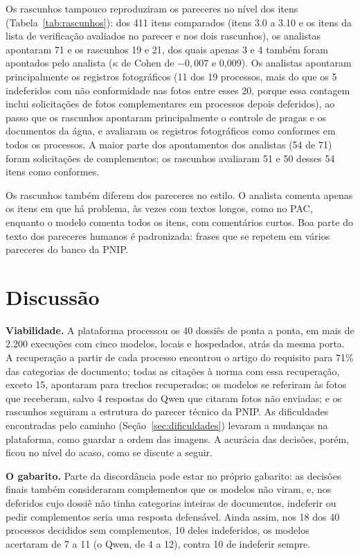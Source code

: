 Os rascunhos tampouco reproduziram os pareceres no nível dos itens (Tabela~\ref{tab:rascunhos}): dos 411 itens comparados (itens 3.0 a 3.10 e os itens da lista de verificação avaliados no parecer e nos dois rascunhos), os analistas apontaram 71 e os rascunhos 19 e 21, dos quais apenas 3 e 4 também foram apontados pelo analista ($\kappa$ de Cohen de $-0{,}007$ e 0,009). Os analistas apontaram principalmente os registros fotográficos (11 dos 19 processos, mais do que os 5 indeferidos com não conformidade nas fotos entre esses 20, porque essa contagem inclui solicitações de fotos complementares em processos depois deferidos), ao passo que os rascunhos apontaram principalmente o controle de pragas e os documentos da água, e avaliaram os registros fotográficos como conformes em todos os processos. A maior parte dos apontamentos dos analistas (54 de 71) foram solicitações de complementos; os rascunhos avaliaram 51 e 50 desses 54 itens como conformes.

Os rascunhos também diferem dos pareceres no estilo. O analista comenta apenas os itens em que há problema, às vezes com textos longos, como no PAC, enquanto o modelo comenta todos os itens, com comentários curtos. Boa parte do texto dos pareceres humanos é padronizada: frases que se repetem em vários pareceres do banco da PNIP.

\section{Discussão}
\label{sec:discussao}

\textbf{Viabilidade.} A plataforma processou os 40 dossiês de ponta a ponta, em mais de 2.200 execuções com cinco modelos, locais e hospedados, atrás da mesma porta. A recuperação a partir de cada processo encontrou o artigo do requisito para 71\% das categorias de documento; todas as citações à norma com essa recuperação, exceto 15, apontaram para trechos recuperados; os modelos se referiram às fotos que receberam, salvo 4 respostas do Qwen que citaram fotos não enviadas; e os rascunhos seguiram a estrutura do parecer técnico da PNIP. As dificuldades encontradas pelo caminho (Seção~\ref{sec:dificuldades}) levaram a mudanças na plataforma, como guardar a ordem das imagens. A acurácia das decisões, porém, ficou no nível do acaso, como se discute a seguir.

\textbf{O gabarito.} Parte da discordância pode estar no próprio gabarito: as decisões finais também consideraram complementos que os modelos não viram, e, nos deferidos cujo dossiê não tinha categorias inteiras de documentos, indeferir ou pedir complementos seria uma resposta defensável. Ainda assim, nos 18 dos 40 processos decididos sem complementos, 10 deles indeferidos, os modelos acertaram de 7 a 11 (o Qwen, de 4 a 12), contra 10 de indeferir sempre.

